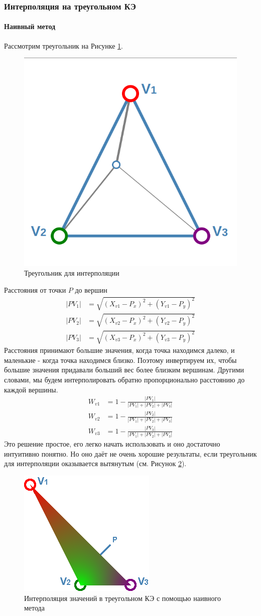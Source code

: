 \subsubsection{Интерполяция на треугольном КЭ}
\paragraph{Наивный метод}
Рассмотрим треугольник на Рисунке \ref{trig}.
\begin{figure}[H]
	\centering
	\includegraphics[width=0.4\linewidth,trim={0 0 0 1cm},clip]{img/trig}
	\caption{Треугольник для интерполяции}
	\label{trig}
\end{figure}
Расстояния от точки $P$ до вершин
\begin{align*}
	|P V_1| &= \sqrt{(X_{v1} - P_{x})^2 + (Y_{v1} - P_{y})^2}\\
	|P V_2| &= \sqrt{(X_{v2} - P_{x})^2 + (Y_{v2} - P_{y})^2}\\
	|P V_3| &= \sqrt{(X_{v3} - P_{x})^2 + (Y_{v3} - P_{y})^2}
\end{align*}
Расстояния принимают большие значения, когда точка находимся далеко, и маленькие - когда точка находимся близко. Поэтому инвертируем их, чтобы большие значения придавали больший вес более близким вершинам. Другими словами, мы будем интерполировать обратно пропорционально расстоянию до каждой вершины. \cite{trig_interpolate}
\begin{align*}
	W_{v1} &= 1 - \frac{|P V_1|}{|P V_1|+|P V_2|+|P V_3|}\\
	W_{v2} &= 1 - \frac{|P V_2|}{|P V_1|+|P V_2|+|P V_3|}\\
	W_{v3} &= 1 - \frac{|P V_3|}{|P V_1|+|P V_2|+|P V_3|}
\end{align*}
Это решение простое, его легко начать использовать и оно достаточно интуитивно понятно. Но оно даёт не очень хорошие результаты, если треугольник для интерполяции оказывается вытянутым (см. Рисунок \ref{tri-int-naive-slant}). 
\begin{figure}[H]
	\centering
	\includegraphics[width=0.45\linewidth]{img/tri-int-naive-slant}
	\caption{Интерполяция значений в треугольном КЭ с помощью наивного метода}
	\label{tri-int-naive-slant}
\end{figure}
